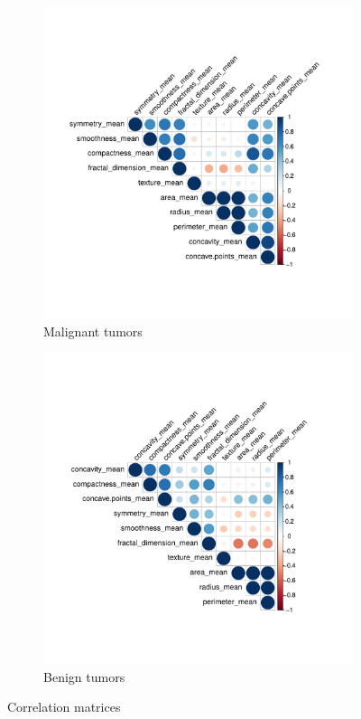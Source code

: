 \begin{figure}[H]
\centering
\begin{subfigure}{.5\textwidth}
  \centering
  \includegraphics[width=.9\linewidth]{figs/q1_correlation_malignant.pdf}
  \caption{Malignant tumors}
\end{subfigure}%
\begin{subfigure}{.5\textwidth}
  \centering
  \includegraphics[width=.9\linewidth]{figs/q1_correlation_benign.pdf}
  \caption{Benign tumors}
\end{subfigure}
\caption{Correlation matrices}
\end{figure}

